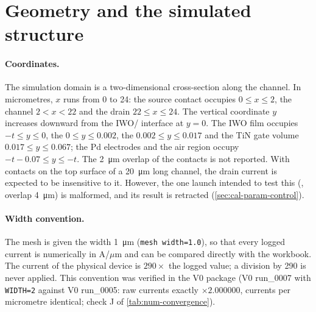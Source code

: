 \section{Geometry and the simulated structure}\label{sec:inp-geometry}

\paragraph{Coordinates.} The simulation domain is a two-dimensional cross-section along the channel. In micrometres,
$x$ runs from 0 to 24: the source contact occupies $0 \le x \le 2$, the channel $2 < x < 22$ and the drain
$22 \le x \le 24$. The vertical coordinate $y$ increases downward from the IWO/\AlO{} interface at $y = 0$. The IWO film
occupies $-t \le y \le 0$, the \AlO{} $0 \le y \le 0.002$, the \HfO{} $0.002 \le y \le 0.017$ and the TiN gate volume
$0.017 \le y \le 0.067$; the Pd electrodes and the air region occupy $-t-0.07 \le y \le -t$. The \SI{2}{\micro\metre}
overlap of the contacts is not reported. With contacts on the top surface of a \SI{20}{\micro\metre} long channel, the
drain current is expected to be insensitive to it. However, the one launch intended to test this (, overlap
\SI{4}{\micro\metre}) is malformed, and its result is retracted (\cref{sec:cal-param-control}).

\paragraph{Width convention.} The mesh is given the width \SI{1}{\micro\metre} (\texttt{mesh width=1.0}), so that every
logged current is numerically in A/$\mu$m and can be compared directly with the workbook. The current of the physical
device is $290 \times$ the logged value; a division by 290 is never applied. This convention was verified in the V0
package (V0 run\_0007 with \texttt{WIDTH=2} against V0 run\_0005: raw currents exactly $\times 2.000000$, currents per
micrometre identical; check J of \cref{tab:num-convergence}).


